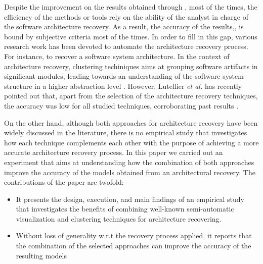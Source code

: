 Despite the improvement on the results obtained through , most of the times, 
the efficiency of the methods or tools rely on the ability of the analyst in charge of the software architecture recovery. As a result, the accuracy of the results,, is bound by subjective criteria most of the times. In order to fill in this gap, various research work has been devoted to automate the architecture recovery process. For instance,  to recover a software system architecture\cite{shtern_clustering_2012, Jain_Murty_1999, Wiggerts, mitchell_heuristic_2002}. 
In the context of architecture recovery, clustering techiniques aims at grouping software artifacts in significant modules, leading towards an understanding of 
the software system structure in a higher abstraction level \cite{shtern_clustering_2012}. However, Lutellier \textit{et al.} \cite{Lutellier_2015} has recently pointed out that, apart from the selection of the architecture recovery techniques, the accuracy was low for all studied techniques, corroborating past results \cite{Garcia:ASE2013}.

On the other hand, although both approaches for architecture recovery have been widely discussed in the literature, there is no empirical study that investigates how each technique complements each other with the purpose of achieving a more accurate architecture recovery process. In this paper we carried out an experiment that aims at understanding how the combination of both approaches improve the accuracy of the models obtained from an architectural recovery. The contributions of the paper are twofold:
\begin{itemize}
\item It presents the design, execution, and main findings of an empirical study that 
investigates the benefits of combining well-known semi-automatic visualization and clustering techniques for architecture recovering. 
\item Without loss of generality w.r.t the recovery process applied, it reports that the combination of the selected approaches can improve the accuracy of the resulting models    
\end{itemize}

